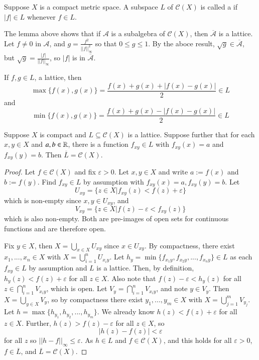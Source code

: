 \begin{defn}[Lattice]
    Suppose $X$ is a compact metric space. A subspace $L$ of $\mathcal{C}(X)$ is called a  if $|f| \in L$ whenever $f \in L$.
\end{defn}

\begin{eg}
    The lemma above shows that if $\mathcal{A}$ is a subalgebra of $\mathcal{C}(X)$, then $\overline{\mathcal{A}}$ is a lattice. Let $f \neq 0$ in $\mathcal{A}$, and $g = \frac{f^2}{||f||_{\infty}^2}$ so that $0 \leq g \leq 1$. By the aboce result, $\sqrt{g} \in \overline{\mathcal{A}}$, but $\sqrt{g} = \frac{|f|}{||f||_{\infty}}$, so $|f|$ is in $\overline{\mathcal{A}}$.
\end{eg}

If $f,g \in L$, a lattice, then $$\max\{f(x),g(x)\} = \frac{f(x)+g(x)+|f(x)-g(x)|}{2} \in L$$ and $$\min\{f(x),g(x)\} = \frac{f(x)+g(x)-|f(x)-g(x)|}{2} \in L$$

\begin{lem}
    Suppose $X$ is compact and $L \subseteq \mathcal{C}(X)$ is a lattice. Suppose further that for each $x,y \in X$ and $a,b \in \mathbb R$, there is a function $f_{xy} \in L$ with $f_{xy}(x) =a $ and $f_{xy}(y) = b$. Then $\overline{L} = \mathcal{C}(X)$.
\end{lem}
\begin{proof}
    Let $f \in \mathcal{C}(X)$ and fix $\varepsilon > 0$. Let $x,y \in X$ and write $a := f(x)$ and $b := f(y)$. Find $f_{xy} \in L$ by assumption with $f_{xy}(x) = a, f_{xy}(y) = b$. Let $$U_{xy} = \{z \in X\vert f_{xy}(z) < f(z)+\varepsilon\}$$ which is non-empty since $x,y \in U_{xy}$, and $$V_{xy} = \{z \in X\vert f(z) - \varepsilon < f_{xy}(z)\}$$ which is also non-empty. Both are pre-images of open sets for continuous functions and are therefore open. 

    Fix $y \in X$, then $X = \bigcup_{x \in X}U_{xy}$ since $x \in U_{xy}$. By compactness, there exist $x_1,...,x_n \in X$ with $X = \bigcup_{i=1}^nU_{x_iy}$. Let $h_y = \min\{f_{x_1y},f_{x_2y},...,f_{x_ny}\} \in L$ as each $f_{xy} \in L$ by assumption and $L$ is a lattice. Then, by definition, $h_y(z) < f(z) + \varepsilon$ for all $z \in X$. Also note that $f(z) - \varepsilon < h_y(z)$ for all $z \in \bigcap_{i=1}^nV_{x_iy}$, which is open. Let $V_y = \bigcap_{i=1}^nV_{x_iy}$, and note $y \in V_y$. Then $X = \bigcup_{y \in X}V_y$, so by compactness there exist $y_1,...,y_m \in X$ with $X = \bigcup_{j=1}^mV_{y_j}$. Let $h = \max\{h_{y_1},h_{y_2},...,h_{y_m}\}$. We already know $h(z) < f(z) + \varepsilon$ for all $z \in X$. Further, $h(z) > f(z) - \varepsilon$ for all $z \in X$, so $$|h(z) - f(z)| < \varepsilon$$ for all $z$ so $||h-f||_{\infty} \leq \varepsilon$. As $h \in L$ and $f \in \mathcal{C}(X)$, and this holds for all $\varepsilon > 0$, $f \in \overline{L}$, and $\overline{L} = \mathcal{C}(X)$.
\end{proof}

